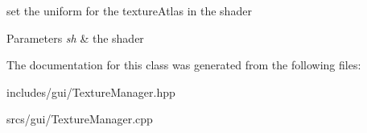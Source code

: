 set the uniform for the texture\+Atlas in the shader 


\begin{DoxyParams}{Parameters}
{\em sh} & the shader \\
\hline
\end{DoxyParams}


The documentation for this class was generated from the following files\+:\begin{DoxyCompactItemize}
\item 
includes/gui/Texture\+Manager.\+hpp\item 
srcs/gui/Texture\+Manager.\+cpp\end{DoxyCompactItemize}
